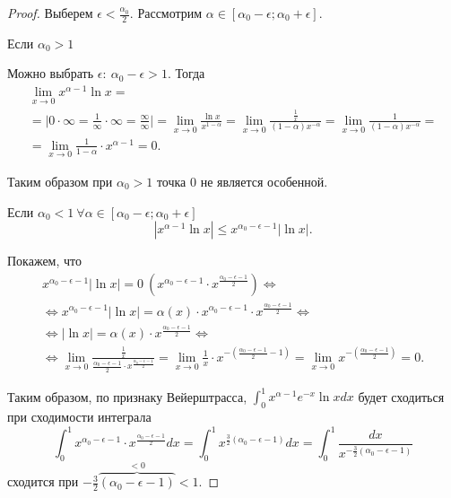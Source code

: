 \begin{enumerate}
\begin{proof}
              Выберем $ \epsilon < \frac{\alpha_0}{2} $. Рассмотрим $ \alpha \in [\alpha_0 - \epsilon;\alpha_0 + \epsilon] $.

              Если $ \alpha_0 > 1 $

              Можно выбрать $ \epsilon : \ \alpha_0 - \epsilon > 1 $. Тогда
              \begin{multline*}
                  \underset{x \rightarrow 0}{\lim}x^{\alpha-1}\ln x = \\
                  = \bigg|0 \cdot \infty = \frac{1}{\infty}\cdot \infty = \frac{\infty}{\infty}\bigg| = \underset{x \rightarrow 0}{\lim}\frac{\ln x}{x^{1-\alpha}} = \underset{x \rightarrow 0}{\lim} \frac{\frac{1}{x}}{(1-\alpha)x^{-\alpha}} = \underset{x \rightarrow 0}{\lim}\frac{1}{(1-\alpha)x^{-\alpha}} = \\
                  = \underset{x \rightarrow 0}{\lim}\frac{1}{1-\alpha}\cdot x^{\alpha-1} = 0.
              \end{multline*}

              Таким образом при $ \alpha_0 > 1 $ точка $ 0 $ не является особенной.

              Если $ \alpha_0 < 1 \ \forall \alpha \in[\alpha_0 - \epsilon;\alpha_0 + \epsilon] $
              \[
                  | x^{\alpha-1}\ln x | \leqslant x^{\alpha_0 - \epsilon -1}| \ln x |.
              \]

              Покажем, что
              \begin{multline*}
                  x^{\alpha_0 - \epsilon - 1}| \ln x | = 0 \ \left(x^{\alpha_0 - \epsilon - 1}\cdot x^{\frac{\alpha_0 - \epsilon - 1}{2}}\right) \iff \\
                  \iff x^{\alpha_0 - \epsilon - 1}| \ln x |  = \alpha(x)\cdot x^{\alpha_0 - \epsilon - 1} \cdot x^{\frac{\alpha_0 - \epsilon - 1}{2}} \iff \\
                  \iff | \ln x | = \alpha(x) \cdot x^{\frac{\alpha_0 - \epsilon - 1}{2}} \iff \\
                  \iff \underset{x \rightarrow 0}{\lim}\frac{\frac{1}{x}}{\frac{\alpha_0 - \epsilon - 1}{2}\cdot x^{\frac{\alpha_0 - \epsilon - 1}{2}}} = \underset{x \rightarrow 0}{\lim}\frac{1}{x}\cdot x^{-\left(\frac{\alpha_0 - \epsilon - 1}{2} - 1\right)} = \underset{x \rightarrow 0}{\lim} x^{-\left(\frac{\alpha_0 - \epsilon -1}{2}\right)} = 0.
              \end{multline*}

              Таким образом, по признаку Вейерштрасса, $ \int_{0}^{1}x^{\alpha-1}e^{-x}\ln x dx $ будет сходиться при сходимости интеграла
              \[
                  \int_{0}^{1}x^{\alpha_0 - \epsilon - 1}\cdot x^{\frac{\alpha_0 - \epsilon - 1}{2}}dx = \int_{0}^{1}x^{\frac{3}{2}(\alpha_0 - \epsilon - 1)}dx = \int_{0}^{1}\frac{dx}{x^{-\frac{3}{2}(\alpha_0 - \epsilon - 1)}}
              \]
              сходится при $ -\frac{3}{2}\overbrace{(\alpha_0 - \epsilon - 1)}^{<0} < 1 $.


\end{proof}
\end{enumerate}
